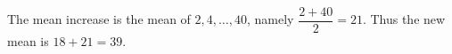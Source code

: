 The mean increase is the mean of $2,4,\ldots,40$, namely $\dfrac{2+40}{2}=21$. Thus the new mean is $18+21=\boxed{39}$.

